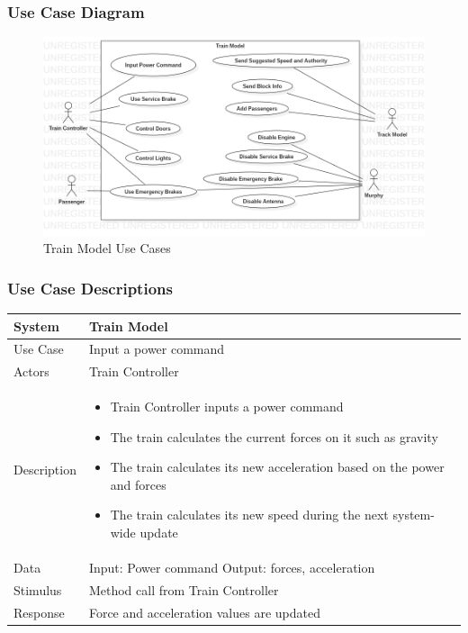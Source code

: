 \documentclass{article}
\begin{document}
    \subsubsection{Use Case Diagram}
    \begin{figure}[H]
        \centering
        \includegraphics[width=\textwidth]{./TrainModel/TrainModel_UseCases.png}
        \caption{Train Model Use Cases}
        \label{fig:Train Model Use Cases}
    \end{figure}
    \subsubsection{Use Case Descriptions}
    \begin{longtable}{
    || >{\raggedright\arraybackslash}m{}
    | >{\raggedright\arraybackslash}m{}||}
    \hline
    \textbf{System} & \textbf{Train Model} \\
    \hline
    Use Case & Input a power command\\
    \hline
    Actors & Train Controller\\
    \hline
    Description & \begin{itemize}
        \item Train Controller inputs a power command
        \item The train calculates the current forces on it such as gravity
        \item The train calculates its new acceleration based on the power and forces
        \item The train calculates its new speed during the next system-wide update
    \end{itemize}\\
    \hline
    Data & Input: Power command \newline Output: forces, acceleration\\
    \hline
    Stimulus & Method call from Train Controller\\
    \hline
    Response & Force and acceleration values are updated\\
    \hline
    \end{longtable}
    
\end{document}
